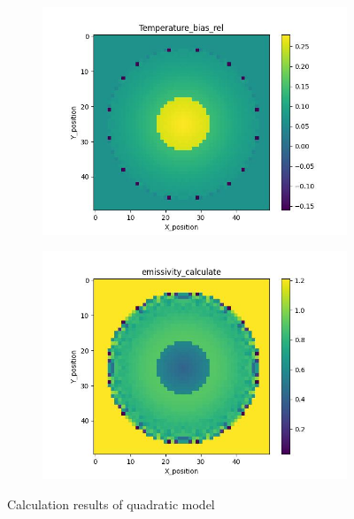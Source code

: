 \begin{figure}[htbp]
\begin{minipage}{\textwidth}
\begin{subfigure}{0.49\textwidth}
        \end{subfigure}
    \end{minipage}\\
    \begin{minipage}{\textwidth}
        \centering
        \begin{subfigure}{0.49\textwidth}
            \centering
            \includegraphics[width=\textwidth]{figures/raw_data/31/quad/T_bias.jpg}
        \end{subfigure}
        \begin{subfigure}{0.49\textwidth}
            \centering
            \includegraphics[width=\textwidth]{figures/raw_data/31/quad/emi_cal.jpg}
        \end{subfigure}
    \end{minipage}
    \caption{Calculation results of quadratic model}
    \label{fig: result_quadratic_model}
\end{figure}

